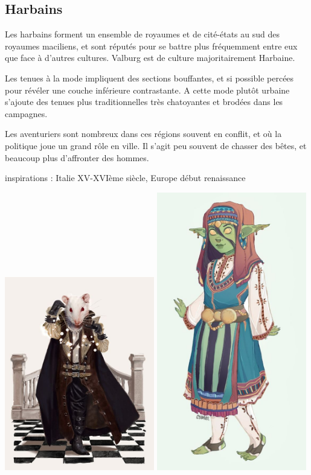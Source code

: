 \documentclass[10pt,a4paper]{book}
\begin{document}
\subsection{Harbains}
Les harbains forment un ensemble de royaumes et de cité-états au sud des royaumes maciliens, et sont réputés pour se battre plus fréquemment entre eux que face à d'autres cultures. Valburg est de culture majoritairement Harbaine.


Les tenues à la mode impliquent des sections bouffantes, et si possible percées pour révéler une couche inférieure contrastante. A cette mode plutôt urbaine s'ajoute des tenues plus traditionnelles très chatoyantes et brodées dans les campagnes.

Les aventuriers sont nombreux dans ces régions souvent en conflit, et où la politique joue un grand rôle en ville. Il s'agit peu souvent de chasser des bêtes, et beaucoup plus d'affronter des hommes.

inspirations : Italie XV-XVIème siècle, Europe début renaissance

\includegraphics[width=0.49\textwidth]{ysoki 1}
\includegraphics[width=0.49\textwidth]{gobelin 1}
\end{document}
